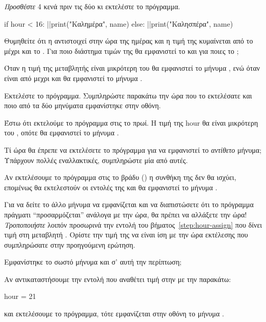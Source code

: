 \documentclass[a4paper,11pt,oneside]{book}
\begin{document}
\begin{step}
\emph{Προσθέστε} 4 κενά πριν τις δύο  κι εκτελέστε το πρόγραμμα.

\begin{pyplain}
if hour < 16:
|\pyhighlight{\vphantom{λρ}    }|print("Καλημέρα", name)
else:
|\pyhighlight{\vphantom{λρ}    }|print("Καλησπέρα", name)
\end{pyplain}

Θυμηθείτε ότι η  αντιστοιχεί στην ώρα της ημέρας και η τιμή της κυμαίνεται από το  μέχρι και το . Για ποιο διάστημα τιμών της  θα εμφανιστεί το  και για ποιες το ;

\begin{answer}
Όταν η τιμή της μεταβλητής  είναι μικρότερη του  θα εμφανιστεί το μήνυμα , ενώ όταν είναι από  μεχρι και  θα εμφανιστεί το μήνυμα .
\end{answer}

Εκτελέστε το πρόγραμμα. Συμπληρώστε παρακάτω την ώρα που το εκτελέσατε και ποιο από τα δύο μηνύματα εμφανίστηκε στην οθόνη.

\begin{answer}
Έστω ότι εκτελούμε το πρόγραμμα στις  το πρωί. Η τιμή της hour θα είναι μικρότερη του , οπότε θα εμφανιστεί το μήνυμα .
\end{answer}

Τί ώρα θα έπρεπε να εκτελέσετε το πρόγραμμα για να εμφανιστεί το \emph{αντίθετο} μήνυμα; Υπάρχουν πολλές εναλλακτικές, συμπληρώστε μία από αυτές.

\begin{answer}
Αν εκτελέσουμε το πρόγραμμα στις  το βράδυ () η συνθήκη της  δεν θα ισχύει, επομένως θα εκτελεστούν οι εντολές της  και θα εμφανιστεί το μήνυμα .
\end{answer}

Για να δείτε το άλλο μήνυμα να εμφανίζεται και να διαπιστώσετε ότι το πρόγραμμα πράγματι ``προσαρμόζεται'' ανάλογα με την ώρα, θα πρέπει να αλλάξετε την ώρα! \emph{Tροποποιήστε} λοιπόν προσωρινά την εντολή του βήματος~\ref{step:hour-assign} που δίνει τιμή στη μεταβλητή . Ορίστε την τιμή της  να είναι ίση με την ώρα εκτέλεσης που συμπληρώσατε στην προηγούμενη ερώτηση.

Εμφανίστηκε το σωστό μήνυμα και σ' αυτή την περίπτωση;

\begin{answer}
Αν αντικαταστήσουμε την εντολή που αναθέτει τιμή στην  με την παρακάτω:

\begin{pynew}
hour = 21
\end{pynew}

και εκτελέσουμε το πρόγραμμα, τότε εμφανίζεται στην οθόνη το μήνυμα .
\end{answer}
\end{step}
\end{document}
